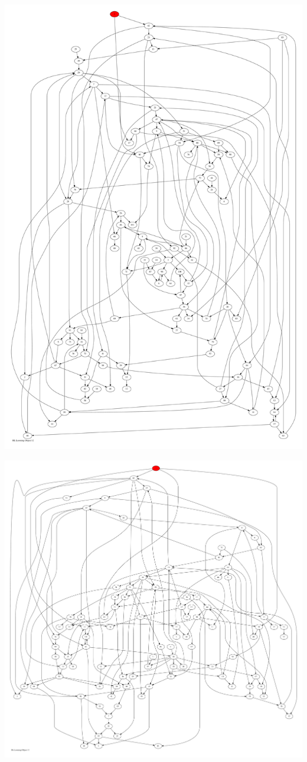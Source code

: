 \documentclass{article}
\begin{document}
\newpage
\includegraphics[max height=\textheight,max width=\textwidth]{bl_looming_objs/bl_loom_obj12_pp.pdf}

\newpage
\includegraphics[max height=\textheight,max width=\textwidth]{bl_looming_objs/bl_loom_obj13_pp.pdf}
\end{document}
